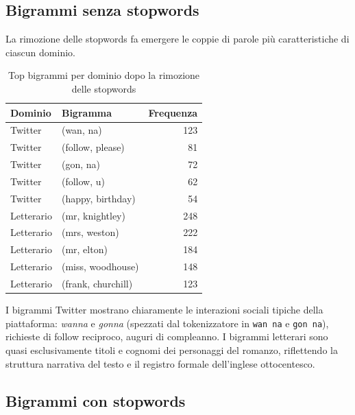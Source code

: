 \documentclass[12pt, a4paper]{article}
\begin{document}
\subsection{Bigrammi senza stopwords}

La rimozione delle stopwords fa emergere le coppie di parole
più caratteristiche di ciascun dominio.

\begin{table}[H]
\centering
\begin{tabular}{llr}
\toprule
\textbf{Dominio} & \textbf{Bigramma} & \textbf{Frequenza} \\
\midrule
Twitter & (wan, na)          & 123 \\
Twitter & (follow, please)   & 81  \\
Twitter & (gon, na)          & 72  \\
Twitter & (follow, u)        & 62  \\
Twitter & (happy, birthday)  & 54  \\
\midrule
Letterario & (mr, knightley)    & 248 \\
Letterario & (mrs, weston)      & 222 \\
Letterario & (mr, elton)        & 184 \\
Letterario & (miss, woodhouse)  & 148 \\
Letterario & (frank, churchill) & 123 \\
\bottomrule
\end{tabular}
\caption{Top bigrammi per dominio dopo la rimozione delle stopwords}
\end{table}

I bigrammi Twitter mostrano chiaramente le interazioni sociali tipiche
della piattaforma: \textit{wanna} e \textit{gonna} (spezzati dal
tokenizzatore in \texttt{wan na} e \texttt{gon na}), richieste di
follow reciproco, auguri di compleanno. I bigrammi letterari sono
quasi esclusivamente titoli e cognomi dei personaggi del romanzo,
riflettendo la struttura narrativa del testo e il registro formale
dell'inglese ottocentesco.

\subsection{Bigrammi con stopwords}
\end{document}
